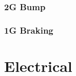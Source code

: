 \documentclass[10pt]{article}
\begin{document}
\subsubsection{2G Bump}

\subsubsection{1G Braking}

\clearpage
\section{Electrical}



%
\end{document}
